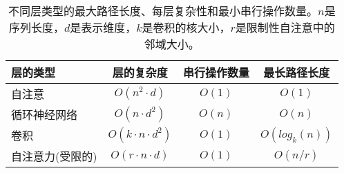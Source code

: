 \begin{table}[t]
\caption{
  不同层类型的最大路径长度、每层复杂性和最小串行操作数量。$n$是序列长度，$d$是表示维度，$k$是卷积的核大小，$r$是限制性自注意中的邻域大小。}
\label{tab:op_complexities}
\begin{center}
\vspace{-1mm}

\begin{tabular}{lccc}
\toprule
层的类型 & 层的复杂度 & 串行操作数量 &  最长路径长度  \\
\hline
\rule{0pt}{2.0ex}自注意 & $O(n^2 \cdot d)$ & $O(1)$ & $O(1)$ \\
循环神经网络 & $O(n \cdot d^2)$ & $O(n)$ & $O(n)$ \\

卷积 & $O(k \cdot n \cdot d^2)$ & $O(1)$ & $O(log_k(n))$ \\
自注意力(受限的)& $O(r \cdot n \cdot d)$ & $O(1)$ & $O(n/r)$ \\





\bottomrule
\end{tabular}
\end{center}
\end{table}


